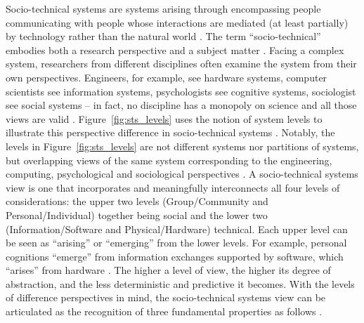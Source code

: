 Socio-technical systems are systems arising through encompassing people communicating with people whose interactions are mediated (at least partially) by technology rather than the natural world \cite{Whitworth2009}.
The term ``socio-technical'' embodies both a research perspective and a subject matter \cite{Lee2001}. Facing a complex system, researchers from different disciplines often examine the system from their own perspectives. Engineers, for example, see hardware systems, computer scientists see information systems, psychologists see cognitive systems, sociologist see social systems -- in fact, no discipline has a monopoly on science and all those views are valid \cite{Whitworth2013}. 
Figure~\ref{fig:sts_levels} uses the notion of system levels to illustrate this perspective difference in socio-technical systems \cite{Whitworth2009,Whitworth2013}. Notably, the levels in Figure~\ref{fig:sts_levels} are not different systems nor partitions of systems, but overlapping views of the same system corresponding to the engineering, computing, psychological and sociological perspectives \cite{Whitworth2009}. A socio-technical systems view is one that incorporates and meaningfully interconnects all four levels of considerations: the upper two levels (Group/Community and Personal/Individual) together being social and the lower two (Information/Software and Physical/Hardware) technical. Each upper level can be seen as   ``arising'' or ``emerging'' from the lower levels. For example, personal cognitions ``emerge'' from information exchanges supported by software, which ``arises'' from hardware \cite{Whitworth2009}. The higher a level of view, the higher its degree of abstraction, and the less deterministic and predictive it becomes.  
% 
With the levels of difference perspectives in mind, the socio-technical systems view can be articulated as the recognition of three fundamental properties as follows \cite{Sawyer2014}. 
%
%
